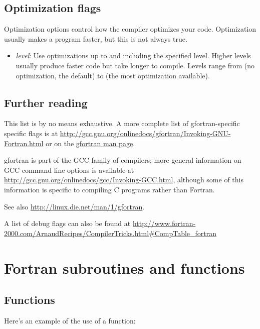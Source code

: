 \documentclass[letterpaper,10pt,english]{sphinxmanual}
\begin{document}
\subsection{Optimization flags}
\label{gfortran_flags:optimization-flags}
Optimization options control how the compiler optimizes your code.
Optimization usually makes a program faster, but this is not always
true.
\begin{itemize}
\item {} 
 \emph{level}: Use optimizations up to and including the specified
level.  Higher levels usually produce faster code but take longer
to compile.  Levels range from  (no optimization, the
default) to  (the most optimization available).

\end{itemize}


\subsection{Further reading}
\label{gfortran_flags:further-reading}
This list is by no means exhaustive.  A more complete list of
gfortran-specific specific flags is at
\href{http://gcc.gnu.org/onlinedocs/gfortran/Invoking-GNU-Fortran.html}{http://gcc.gnu.org/onlinedocs/gfortran/Invoking-GNU-Fortran.html}
or on the \href{http://linux.die.net/man/1/gfortran}{gfortran man page}.

gfortran is part of the GCC family of compilers; more general
information on GCC command line options is available at
\href{http://gcc.gnu.org/onlinedocs/gcc/Invoking-GCC.html}{http://gcc.gnu.org/onlinedocs/gcc/Invoking-GCC.html}, although
some of this information is specific to compiling C programs rather
than Fortran.

See also \href{http://linux.die.net/man/1/gfortran}{http://linux.die.net/man/1/gfortran}.

A list of debug flags can also be found at
\href{http://www.fortran-2000.com/ArnaudRecipes/CompilerTricks.html\#CompTable\_fortran}{http://www.fortran-2000.com/ArnaudRecipes/CompilerTricks.html\#CompTable\_fortran}


\section{Fortran subroutines and functions}
\label{fortran_sub:fortran-sub}\label{fortran_sub::doc}\label{fortran_sub:fortran-subroutines-and-functions}

\subsection{Functions}
\label{fortran_sub:functions}
Here's an example of the use of a function:
\end{document}
